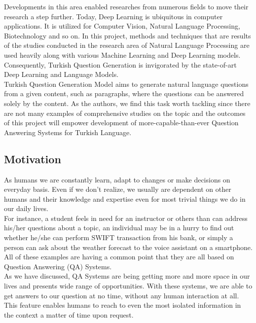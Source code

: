 \documentclass{mefsdp}
\begin{document}
	Developments in this area enabled researches from numerous fields to move their research a step further. Today, Deep Learning is ubiquitous in computer applications. It is utilized for Computer Vision, Natural Language Processing, Biotechnology and so on. In this project, methods and techniques that are results of the studies conducted in the research area of Natural Language Processing are used heavily along with various Machine Learning and Deep Learning models. Consequently, Turkish Question Generation is invigorated by the state-of-art Deep Learning and Language Models.\\
	
	Turkish Question Generation Model aims to generate natural language questions from a given content, such as paragraphs, where the questions can be answered solely by the content.   As the authors, we find this task worth tackling since there are not many examples of comprehensive studies on the topic and the outcomes of this project will empower development of more-capable-than-ever Question Answering Systems for Turkish Language. 
	\newpage
	
	\subsection{Motivation}
	
	As humans we are constantly learn, adapt to changes or make decisions on everyday basis. Even if we don’t realize, we usually are dependent on other humans and their knowledge and expertise even for most trivial things we do in our daily lives.\\
	
	For instance, a student feels in need for an instructor or others than can address his/her questions about a topic, an individual may be in a hurry to find out whether he/she can perform SWIFT transaction from his bank, or simply a person can ask about the weather forecast to the voice assistant on a smartphone. All of these examples are having a common point that they are all based on Question Answering (QA) Systems.\\
	
	As we have discussed, QA Systems are being getting more and more space in our lives and presents wide range of opportunities. With these systems, we are able to get answers to our question at no time, without any human interaction at all. This feature enables humans to reach to even the most isolated information in the context a matter of time upon request.\\
	
\end{document}
